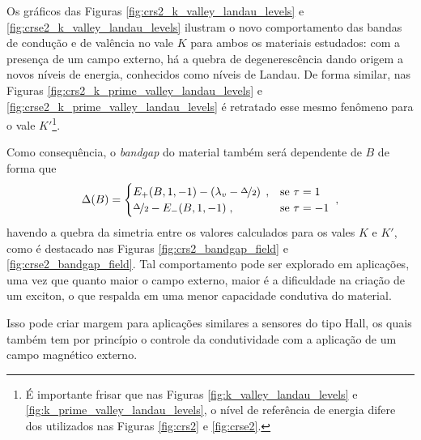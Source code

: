 Os gráficos das Figuras \ref{fig:crs2_k_valley_landau_levels} e
\ref{fig:crse2_k_valley_landau_levels} ilustram o novo comportamento das bandas
de condução e de valência no vale $K$ para ambos os materiais estudados: com a
presença de um campo externo, há a quebra de degenerescência dando origem a
novos níveis de energia, conhecidos como níveis de Landau. De forma similar, nas
Figuras \ref{fig:crs2_k_prime_valley_landau_levels} e
\ref{fig:crse2_k_prime_valley_landau_levels} é retratado esse mesmo fenômeno
para o vale $K'$\footnote{
  É importante frisar que nas Figuras \ref{fig:k_valley_landau_levels} e
  \ref{fig:k_prime_valley_landau_levels}, o nível de referência de energia difere
  dos utilizados nas Figuras \ref{fig:crs2} e \ref{fig:crse2}.
}.

Como consequência, o \textit{bandgap} do material também será dependente de $B$ de forma que
\begin{equation}
  \Delta(B) = 
  \begin{cases}
    E_+(B, 1, -1) - \left( \lambda_v - \nicefrac{\Delta}{2} \right) \;, & \text{se } \tau = 1  \\
    \nicefrac{\Delta}{2} - E_-(B, 1, -1) \;,                            & \text{se } \tau = -1 \\
  \end{cases}
  \;\mathrm{,}
  \label{eq:new_bandgap}
\end{equation}
havendo a quebra da simetria entre os valores calculados para os vales $K$ e
$K'$, como é destacado nas Figuras \ref{fig:crs2_bandgap_field} e
\ref{fig:crse2_bandgap_field}. Tal comportamento pode ser explorado em
aplicações, uma vez que quanto maior o campo externo, maior é a dificuldade na
criação de um exciton, o que respalda em uma menor capacidade condutiva do
material.  

Isso pode criar margem para aplicações similares a sensores do tipo Hall, os quais
também tem por princípio o controle da condutividade com a aplicação de um campo
magnético externo.

